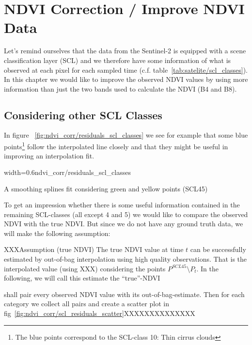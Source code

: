 \chapter{NDVI Correction / Improve NDVI Data}

Let's remind ourselves that the data from the Sentinel-2 is equipped with a scene classification layer (SCL) and we therefore have some information of what is observed at each pixel for each sampled time (c.f. table~\ref{tab:satelite/scl_classes}). In this chapter we would like to improve the observed NDVI values by using more information than just the two bands used to calculate the NDVI (B4 and B8).

\section{Considering other SCL Classes}
In figure ~\ref{fig:ndvi_corr/residuals_scl_classes} we see for example that some blue points\footnote{The blue points correspond to the SCL-class 10: Thin cirrus clouds} follow the interpolated line closely and that they might be useful in improving an interpolation fit.

\begin{my_figure}[ht]{width=0.6\textwidth}{ndvi_corr/residuals_scl_classes}
    \caption{A smoothing splines fit considering green and yellow points (SCL45)}
    \label{fig:ndvi_corr/residuals_scl_classes}
\end{my_figure}

To get an impression whether there is some useful information contained in the remaining SCL-classes (all except 4 and 5) we would like to compare the observed NDVI with the true NDVI. But since we do not have any ground truth data, we will make the following assumption:


\begin{definition}{XXXAssumption (true NDVI)}
    The true NDVI value at time $t$ can be successfully estimated by out-of-bag interpolation using high quality observations. That is the interpolated value (using XXX) considering the points $P^{SCL45}\setminus P_t$. In the following, we will call this estimate the ``true''-NDVI
\end{definition}

shall pair every observed NDVI value with its out-of-bag-estimate. Then for each category we collect all pairs and create a scatter plot in fig~\ref{fig:ndvi_corr/scl_residuals_scatter}XXXXXXXXXXXXXX



